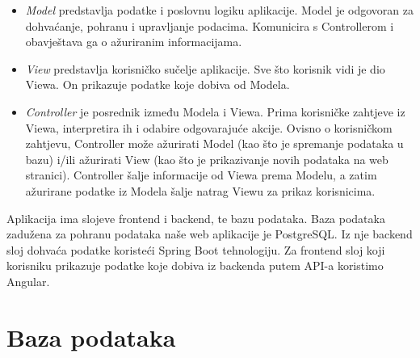 		\begin{itemize}
			\item \textit{Model} predstavlja podatke i poslovnu logiku aplikacije. Model je odgovoran za dohvaćanje, pohranu i upravljanje podacima. Komunicira s Controllerom i obavještava ga o ažuriranim informacijama.
			
			\item \textit{View} predstavlja korisničko sučelje aplikacije. Sve što korisnik vidi je dio Viewa. On prikazuje podatke koje dobiva od Modela.
			
			\item \textit{Controller} je posrednik između Modela i Viewa. Prima korisničke zahtjeve iz Viewa, interpretira ih i odabire odgovarajuće akcije. Ovisno o korisničkom zahtjevu, Controller može ažurirati Model (kao što je spremanje podataka u bazu) i/ili ažurirati View (kao što je prikazivanje novih podataka na web stranici). Controller šalje informacije od Viewa prema Modelu, a zatim ažurirane podatke iz Modela šalje natrag Viewu za prikaz korisnicima.
		\end{itemize}
		
		 
		Aplikacija ima slojeve frontend i backend, te bazu podataka. Baza podataka zadužena za pohranu podataka naše web aplikacije je PostgreSQL. Iz nje backend sloj dohvaća podatke koristeći Spring Boot tehnologiju. Za frontend sloj koji korisniku prikazuje podatke koje dobiva iz backenda putem API-a koristimo Angular.
		

		

				
		\section{Baza podataka}
			
			
			
